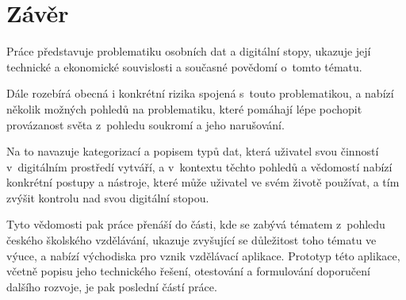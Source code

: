 \chapter*{Závěr}

Práce představuje problematiku osobních dat a digitální stopy, ukazuje její technické a ekonomické souvislosti a současné povědomí o~tomto tématu.

Dále rozebírá obecná i konkrétní rizika spojená s~touto problematikou, a nabízí několik možných pohledů na problematiku, které pomáhají lépe pochopit provázanost světa z~pohledu soukromí a jeho narušování.

Na to navazuje kategorizací a popisem typů dat, která uživatel svou činností v~digitálním prostředí vytváří, a v~kontextu těchto pohledů a vědomostí nabízí konkrétní postupy a nástroje, které může uživatel ve svém životě používat, a tím zvýšit kontrolu nad svou digitální stopou.

Tyto vědomosti pak práce přenáší do části, kde se zabývá tématem z~pohledu českého školského vzdělávání, ukazuje zvyšující se důležitost toho tématu ve výuce, a nabízí východiska pro vznik vzdělávací aplikace.
Prototyp této aplikace, včetně popisu jeho technického řešení, otestování a formulování doporučení dalšího rozvoje, je pak poslední částí práce.
